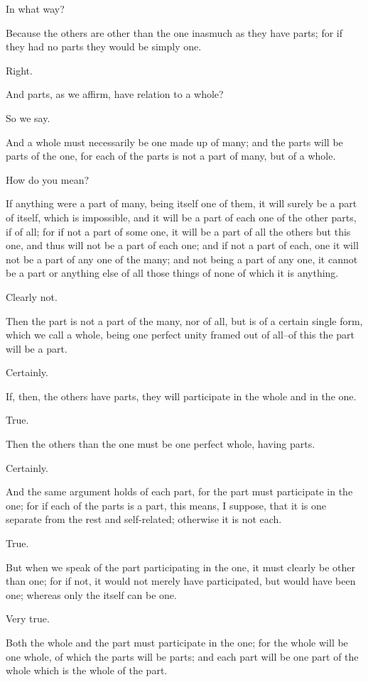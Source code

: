 In what way?

Because the others are other than the one inasmuch as they have parts;
for if they had no parts they would be simply one.

Right.

And parts, as we affirm, have relation to a whole?

So we say.

And a whole must necessarily be one made up of many; and the parts will
be parts of the one, for each of the parts is not a part of many, but of
a whole.

How do you mean?

If anything were a part of many, being itself one of them, it will
surely be a part of itself, which is impossible, and it will be a part
of each one of the other parts, if of all; for if not a part of some
one, it will be a part of all the others but this one, and thus will not
be a part of each one; and if not a part of each, one it will not be a
part of any one of the many; and not being a part of any one, it cannot
be a part or anything else of all those things of none of which it is
anything.

Clearly not.

Then the part is not a part of the many, nor of all, but is of a certain
single form, which we call a whole, being one perfect unity framed out
of all--of this the part will be a part.

Certainly.

If, then, the others have parts, they will participate in the whole and
in the one.

True.

Then the others than the one must be one perfect whole, having parts.

Certainly.

And the same argument holds of each part, for the part must participate
in the one; for if each of the parts is a part, this means, I suppose,
that it is one separate from the rest and self-related; otherwise it is
not each.

True.

But when we speak of the part participating in the one, it must clearly
be other than one; for if not, it would not merely have participated,
but would have been one; whereas only the itself can be one.

Very true.

Both the whole and the part must participate in the one; for the whole
will be one whole, of which the parts will be parts; and each part will
be one part of the whole which is the whole of the part.

